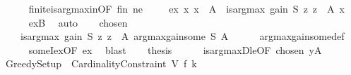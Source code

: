 \begin{isabellebody}
\ \ \ \ \isamarkupfalse%
\ finite{\isacharunderscore}{\kern0pt}is{\isacharunderscore}{\kern0pt}arg{\isacharunderscore}{\kern0pt}max{\isacharunderscore}{\kern0pt}in{\isacharbrackleft}{\kern0pt}OF\ fin\ ne{\isacharbrackright}{\kern0pt}\ \isakeywordONE{{\isachardot}{\kern0pt}}\isamarkupfalse%
\isanewline
\isanewline
\ \ \isamarkupfalse%
\ ex{\isacharcolon}{\kern0pt}\ {\isachardoublequoteopen}{\isasymexists}x{\isachardot}{\kern0pt}\ x\ {\isasymin}\ A\ {\isasymand}\ is{\isacharunderscore}{\kern0pt}arg{\isacharunderscore}{\kern0pt}max\ {\isacharparenleft}{\kern0pt}gain\ S{\isacharparenright}{\kern0pt}\ {\isacharparenleft}{\kern0pt}{\isasymlambda}z{\isachardot}{\kern0pt}\ z\ {\isasymin}\ A{\isacharparenright}{\kern0pt}\ x{\isachardoublequoteclose}\isanewline
\ \ \ \ \isamarkupfalse%
\ exB\ \isamarkupfalse%
\ auto\isanewline
\isanewline
\ \ \isamarkupfalse%
\ chosen{\isacharcolon}{\kern0pt}\isanewline
\ \ \ \ {\isachardoublequoteopen}is{\isacharunderscore}{\kern0pt}arg{\isacharunderscore}{\kern0pt}max\ {\isacharparenleft}{\kern0pt}gain\ S{\isacharparenright}{\kern0pt}\ {\isacharparenleft}{\kern0pt}{\isasymlambda}z{\isachardot}{\kern0pt}\ z\ {\isasymin}\ A{\isacharparenright}{\kern0pt}\ {\isacharparenleft}{\kern0pt}argmax{\isacharunderscore}{\kern0pt}gain{\isacharunderscore}{\kern0pt}some\ S\ A{\isacharparenright}{\kern0pt}{\isachardoublequoteclose}\isanewline
\ \ \ \ \isamarkupfalse%
\ argmax{\isacharunderscore}{\kern0pt}gain{\isacharunderscore}{\kern0pt}some{\isacharunderscore}{\kern0pt}def\isanewline
\ \ \ \ \isamarkupfalse%
\ someI{\isacharunderscore}{\kern0pt}ex{\isacharbrackleft}{\kern0pt}OF\ ex{\isacharbrackright}{\kern0pt}\ \isamarkupfalse%
\ blast\isanewline
\isanewline
\ \ \isamarkupfalse%
\ {\isacharquery}{\kern0pt}thesis\isanewline
\ \ \ \ \isamarkupfalse%
\ is{\isacharunderscore}{\kern0pt}arg{\isacharunderscore}{\kern0pt}maxD{\isacharunderscore}{\kern0pt}le{\isacharbrackleft}{\kern0pt}OF\ chosen\ yA{\isacharbrackright}{\kern0pt}\ \isakeywordONE{{\isachardot}{\kern0pt}}\isamarkupfalse%
\isanewline
{}\isamarkupfalse%
%
\endisatagproof
{\isafoldproof}%
%
\isadelimproof
\isanewline
%
\endisadelimproof
\isanewline
{}\isamarkupfalse%
\isanewline
\isanewline
{}\isamarkupfalse%
\ Greedy{\isacharunderscore}{\kern0pt}Setup\ {\isacharequal}{\kern0pt}\ Cardinality{\isacharunderscore}{\kern0pt}Constraint\ V\ f\ k\isanewline

\end{isabellebody}
